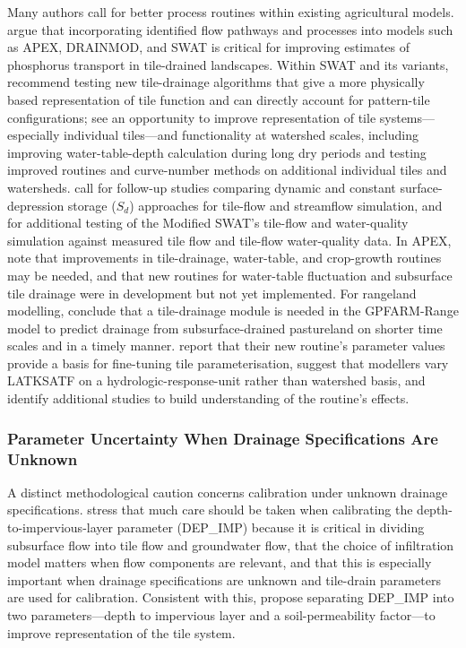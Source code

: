\documentclass[11pt]{article}
\begin{document}
Many authors call for better process routines within existing agricultural models. \textcite{Williams2016} argue that incorporating identified flow pathways and processes into models such as APEX, DRAINMOD, and SWAT is critical for improving estimates of phosphorus transport in tile-drained landscapes. Within SWAT and its variants, \textcite{Schilling2019} recommend testing new tile-drainage algorithms that give a more physically based representation of tile function and can directly account for pattern-tile configurations; \textcite{Guo2018b} see an opportunity to improve representation of tile systems---especially individual tiles---and functionality at watershed scales, including improving water-table-depth calculation during long dry periods and testing improved routines and curve-number methods on additional individual tiles and watersheds. \textcite{Moriasi2012} call for follow-up studies comparing dynamic and constant surface-depression storage ($S_d$) approaches for tile-flow and streamflow simulation, and for additional testing of the Modified SWAT's tile-flow and water-quality simulation against measured tile flow and tile-flow water-quality data. In APEX, \textcite{Nelson2018} note that improvements in tile-drainage, water-table, and crop-growth routines may be needed, and that new routines for water-table fluctuation and subsurface tile drainage were in development but not yet implemented. For rangeland modelling, \textcite{Chen2016} conclude that a tile-drainage module is needed in the GPFARM-Range model to predict drainage from subsurface-drained pastureland on shorter time scales and in a timely manner. \textcite{Boles2015} report that their new routine's parameter values provide a basis for fine-tuning tile parameterisation, suggest that modellers vary LATKSATF on a hydrologic-response-unit rather than watershed basis, and identify additional studies to build understanding of the routine's effects.

\subsubsection{Parameter Uncertainty When Drainage Specifications Are Unknown}

A distinct methodological caution concerns calibration under unknown drainage specifications. \textcite{Bauwe2016} stress that much care should be taken when calibrating the depth-to-impervious-layer parameter (DEP\_IMP) because it is critical in dividing subsurface flow into tile flow and groundwater flow, that the choice of infiltration model matters when flow components are relevant, and that this is especially important when drainage specifications are unknown and tile-drain parameters are used for calibration. Consistent with this, \textcite{Guo2018b} propose separating DEP\_IMP into two parameters---depth to impervious layer and a soil-permeability factor---to improve representation of the tile system.
\end{document}
